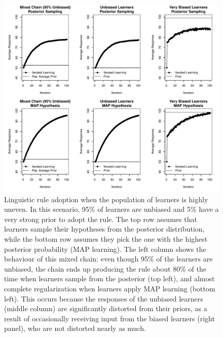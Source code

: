 \documentclass[doc]{apa6}
\begin{document}
\begin{figure}[p]
\begin{center}
\includegraphics[width=14cm]{coinsfail4.pdf}
\caption{\small{Linguistic rule adoption when the population of learners is highly uneven. In this scenario, 95\% of learners are unbiased and 5\% have a very strong prior to adopt the rule. The top row assumes that learners sample their hypotheses from the posterior distribution, while the bottom row assumes they pick the one with the highest posterior probability (MAP learning). The left column shows the behaviour of this mixed chain: even though 95\% of the learners are unbiased, the chain ends up producing the rule about 80\% of the time when learners sample from the posterior (top left), and almost complete regularization when learners apply MAP learning (bottom left). This occurs because the responses of the unbiased learners (middle column) are significantly distorted from their priors, as a result of occasionally receiving input from the biased learners (right panel), who are not distorted nearly as much.}}
\label{coinsfail4}
\end{center}
\end{figure}
\end{document}
